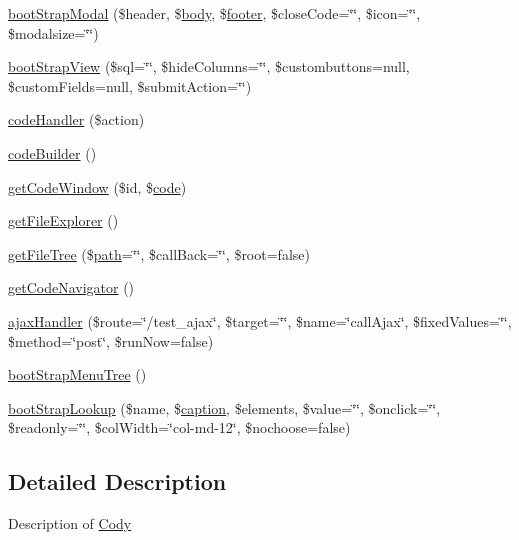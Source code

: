 \begin{DoxyCompactItemize}
\item 
\hyperlink{classCody_a7f214a9c8f38f3f72b6209bbfa18b757}{boot\+Strap\+Modal} (\$header, \$\hyperlink{Shape_8php_a88c61c5f59a3f950b502f07325de2f87}{body}, \$\hyperlink{Shape_8php_ae5058e5b790e8cea2dd33c1c9bbcbbd4}{footer}, \$close\+Code=\char`\"{}\char`\"{}, \$icon=\char`\"{}\char`\"{}, \$modalsize=\char`\"{}\char`\"{})
\item 
\hyperlink{classCody_a8518bcc95441b4c3e7fbae070c0402fb}{boot\+Strap\+View} (\$sql=\char`\"{}\char`\"{}, \$hide\+Columns=\char`\"{}\char`\"{}, \$custombuttons=null, \$custom\+Fields=null, \$submit\+Action=\char`\"{}\char`\"{})
\item 
\hyperlink{classCody_a9d96d2252b6a5ae82ebeeb6fffcfdb58}{code\+Handler} (\$action)
\item 
\hyperlink{classCody_a993ccef820ff205c9a96511a473ff9f7}{code\+Builder} ()
\item 
\hyperlink{classCody_a4b33bd3c589058703a35914506890293}{get\+Code\+Window} (\$id, \$\hyperlink{Shape_8php_ab09356b52e00cf46f1ee5be7344c9139}{code})
\item 
\hyperlink{classCody_a5737b5a18b58d98dc4a6f8ebc9053d3b}{get\+File\+Explorer} ()
\item 
\hyperlink{classCody_aff64a768f79ea2641d2a1ac1b5a976a5}{get\+File\+Tree} (\$\hyperlink{Shape_8php_a3b05eec13add53df44e232273d718ae4}{path}=\char`\"{}\char`\"{}, \$call\+Back=\char`\"{}\char`\"{}, \$root=false)
\item 
\hyperlink{classCody_aba8685265ba1d7dc8bae6250242a7956}{get\+Code\+Navigator} ()
\item 
\hyperlink{classCody_a575c69bd5fe37c9d6e08016e109ab0ee}{ajax\+Handler} (\$route=\char`\"{}/test\+\_\+ajax\char`\"{}, \$target=\char`\"{}\char`\"{}, \$name=\char`\"{}call\+Ajax\char`\"{}, \$fixed\+Values=\char`\"{}\char`\"{}, \$method=\char`\"{}post\char`\"{}, \$run\+Now=false)
\item 
\hyperlink{classCody_a7ce9d2ec93f884278cac8f406b849a11}{boot\+Strap\+Menu\+Tree} ()
\item 
\hyperlink{classCody_a877f34e4ebb7e75f2f12252a98fad5d2}{boot\+Strap\+Lookup} (\$name, \$\hyperlink{Shape_8php_af310fcd32ca64d696b944cf99bf602ff}{caption}, \$elements, \$value=\char`\"{}\char`\"{}, \$onclick=\char`\"{}\char`\"{}, \$readonly=\char`\"{}\char`\"{}, \$col\+Width=\char`\"{}col-\/md-\/12\char`\"{}, \$nochoose=false)
\end{DoxyCompactItemize}


\subsection{Detailed Description}
Description of \hyperlink{classCody}{Cody}

